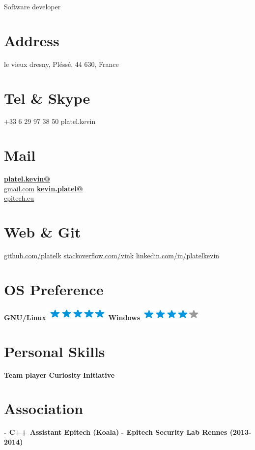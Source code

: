 \documentclass[10pt]{friggeri-cv}
\begin{document}
      {Software developer}
      

\begin{aside}
  \section{Address}
    le vieux dresny,
    Pléssé, 44 630,
    France
  \section{Tel \& Skype}
    +33 6 29 97 38 50
    platel.kevin
  \section{Mail}
    \href{mailto:platel.kevin@gmail.com}{\textbf{platel.kevin@}\\gmail.com}
    \href{mailto:kevin.platel@epitech.eu}{\textbf{kevin.platel@}\\epitech.eu}
  \section{Web \& Git}
    \href{https://github.com/platelk}{github.com/platelk}
    \href{http://stackoverflow.com/users/3676180/vink}{stackoverflow.com/vink}
    \href{http://fr.linkedin.com/in/platelkevin}{linkedin.com/in/platelkevin}
  \section{OS Preference}
    \textbf{GNU/Linux}\includegraphics[scale=0.40]{img/5stars.png}
    \textbf{Windows}\includegraphics[scale=0.40]{img/4stars.png}
  \section{Personal Skills}
    \textbf{Team player}
    \textbf{Curiosity}
    \textbf{Initiative}
  \section{Association}
    \textbf{- C++ Assistant Epitech (Koala)}
    \textbf{- Epitech Security Lab Rennes (2013-2014)}

\end{aside}
\end{document}
